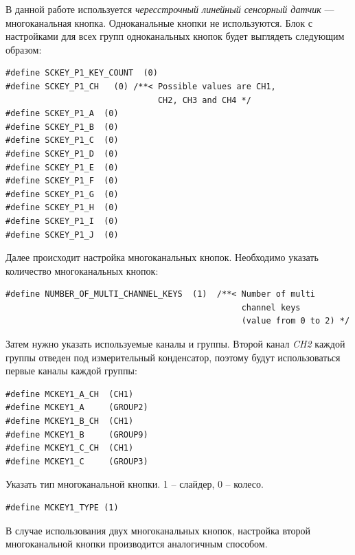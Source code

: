 В данной работе используется \textit{чересстрочный линейный сенсорный датчик} --- многоканальная кнопка. Одноканальные кнопки не используются. Блок с настройками для всех групп одноканальных кнопок будет выглядеть следующим образом:
\begin{verbatim}
#define SCKEY_P1_KEY_COUNT  (0)
#define SCKEY_P1_CH   (0) /**< Possible values are CH1, 
                               CH2, CH3 and CH4 */
#define SCKEY_P1_A  (0)
#define SCKEY_P1_B  (0)
#define SCKEY_P1_C  (0)
#define SCKEY_P1_D  (0)
#define SCKEY_P1_E  (0)
#define SCKEY_P1_F  (0)
#define SCKEY_P1_G  (0)
#define SCKEY_P1_H  (0)
#define SCKEY_P1_I  (0)
#define SCKEY_P1_J  (0)
\end{verbatim}
Далее происходит настройка многоканальных кнопок. Необходимо указать количество многоканальных кнопок:
\begin{verbatim}
#define NUMBER_OF_MULTI_CHANNEL_KEYS  (1)  /**< Number of multi 
                                                channel keys 
                                                (value from 0 to 2) */
\end{verbatim}
Затем нужно указать используемые каналы и группы. Второй канал \textit{CH2} каждой группы отведен под измерительный конденсатор, поэтому будут использоваться первые каналы каждой группы:
\begin{verbatim}
#define MCKEY1_A_CH  (CH1)      
#define MCKEY1_A     (GROUP2)   
#define MCKEY1_B_CH  (CH1)      
#define MCKEY1_B     (GROUP9)   
#define MCKEY1_C_CH  (CH1)      
#define MCKEY1_C     (GROUP3)
\end{verbatim}
Указать тип многоканальной кнопки. 1 -- слайдер, 0 -- колесо.
\begin{verbatim}
#define MCKEY1_TYPE (1)
\end{verbatim}
В случае использования двух многоканальных кнопок, настройка второй многоканальной кнопки производится аналогичным способом.

